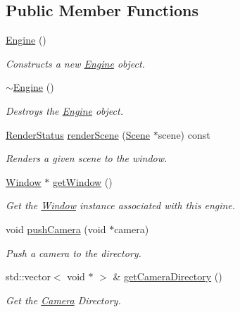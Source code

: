 \subsection*{Public Member Functions}
\begin{DoxyCompactItemize}
\item 
\hyperlink{classpcs_1_1Engine_a73a5c3ce66c2c033835f19f95b67f3ea}{Engine} ()
\begin{DoxyCompactList}\small\item\em Constructs a new \hyperlink{classpcs_1_1Engine}{Engine} object. \end{DoxyCompactList}\item 
\hyperlink{classpcs_1_1Engine_aa6a523009abf3a61d9682a846c780207}{$\sim$\+Engine} ()
\begin{DoxyCompactList}\small\item\em Destroys the \hyperlink{classpcs_1_1Engine}{Engine} object. \end{DoxyCompactList}\item 
\hyperlink{namespacepcs_a979c2971659f1655c7ebe27752b8a9a0}{Render\+Status} \hyperlink{classpcs_1_1Engine_ad99225f71f2e1dd2b02bd99ad2c59ab3}{render\+Scene} (\hyperlink{classpcs_1_1Scene}{Scene} $\ast$scene) const
\begin{DoxyCompactList}\small\item\em Renders a given scene to the window. \end{DoxyCompactList}\item 
\hyperlink{classpcs_1_1Window}{Window} $\ast$ \hyperlink{classpcs_1_1Engine_a3bf8432ad5c397ea7bb3f95728fa9792}{get\+Window} ()
\begin{DoxyCompactList}\small\item\em Get the \hyperlink{classpcs_1_1Window}{Window} instance associated with this engine. \end{DoxyCompactList}\item 
void \hyperlink{classpcs_1_1Engine_ab43d2dd55c8519da49f92e7ccef042a8}{push\+Camera} (void $\ast$camera)
\begin{DoxyCompactList}\small\item\em Push a camera to the directory. \end{DoxyCompactList}\item 
std\+::vector$<$ void $\ast$ $>$ \& \hyperlink{classpcs_1_1Engine_a71059ef96479c7ca59901bfa0be2587a}{get\+Camera\+Directory} ()
\begin{DoxyCompactList}\small\item\em Get the \hyperlink{classpcs_1_1Camera}{Camera} Directory. \end{DoxyCompactList}\end{DoxyCompactItemize}
